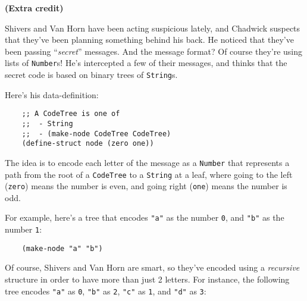 \documentclass[12pt]{article}                   %
\def\pts#1{\marginpar{\footnotesize \raggedright  \fbox{#1 {\sc Points}}}}
\newenvironment{solution}{}{}
\newcommand\code[1]{\texttt{#1}}
\begin{document}
\ifrubric\bigskip\else
{}
\newpage
\fi




\begin{problem}\pts{6}
\textbf{(Extra credit)}

Shivers and Van Horn have been acting suspicious lately, and Chadwick
suspects that they've been planning something behind his back.  He
noticed that they've been passing ``\textit{secret}'' messages.  And
the message format? Of course they're using lists of \code{Number}s!
He's intercepted a few of their messages, and thinks that the secret
code is based on binary trees of \code{String}s.

\bigskip\noindent
Here's his data-definition:

\begin{verbatim}
    ;; A CodeTree is one of
    ;;  - String
    ;;  - (make-node CodeTree CodeTree)
    (define-struct node (zero one))
\end{verbatim}

\noindent The idea is to encode each letter of the message as a
\code{Number} that represents a path from the root of a
\code{CodeTree} to a \code{String} at a leaf, where going to the left
(\code{zero}) means the number is even, and going right (\code{one})
means the number is odd.

\noindent For example, here's a tree that encodes \code{"a"} as the
number \code{0}, and \code{"b"} as the number \code{1}:
\begin{verbatim}
    (make-node "a" "b")
\end{verbatim}

\noindent Of course, Shivers and Van Horn are smart, so they've
encoded using a \textit{recursive} structure in order to have more
than just 2 letters. For instance, the following tree encodes
\code{"a"} as \code{0}, \code{"b"} as \code{2}, \code{"c"} as
\code{1}, and \code{"d"} as \code{3}:


\end{problem}
\end{document}
